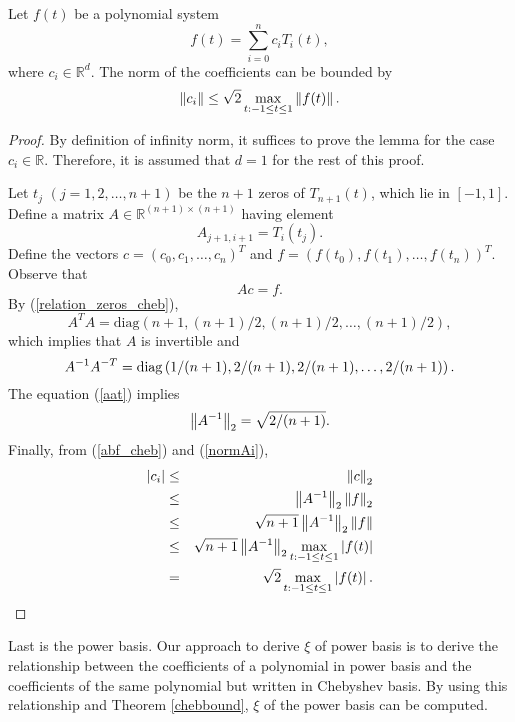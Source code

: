 \documentclass[12pt]{article}
\begin{document}
\begin{thm}
\label{chebbound} Let $f(t)$ be a polynomial system
\[
f(t) = \sum_{i=0}^n c_{i} T_i(t),
\]
where $c_{i} \in \mathbb{R}^d$. The norm of the coefficients
can be bounded by
\begin{equation}
\left\|c_{i}\right\| \leq  \sqrt{2} \max_{t : -1
\leq t \leq 1} \left\|f(t)\right\|.
\end{equation}
\end{thm}
\begin{proof}
By definition of infinity norm, it suffices to prove the lemma for
the case $c_i \in \mathbb{R}$.  Therefore, it is assumed that
$d = 1$ for the rest of this proof.

Let $t_j$ $(j=1,2,\ldots,n+1)$ be the $n+1$ zeros of $T_{n+1}(t)$,
which lie in $[-1,1]$. Define a matrix $A \in \mathbb{R}^{(n+1)
\times (n+1)}$ having element
\[
A_{j+1,i+1}=T_i(t_j).
\]
Define the vectors $c = (c_0, c_1, \ldots, c_n)^T$ and
$f = \left( f(t_0), f(t_1), \ldots, f(t_n) \right)^T.$
Observe that
\begin{equation}
\label{abf_cheb}
Ac = f.
\end{equation}
By (\ref{relation_zeros_cheb}),
\[
A^T A = \mathrm{diag}\left(n+1,(n+1)/2,(n+1)/2,\ldots,(n+1)/2\right),
\]
which implies that $A$ is invertible and
\begin{equation}
\label{aat}
A^{-1}A^{-T} = \mathrm{diag}\left(1/(n+1),2/(n+1),2/(n+1),\ldots,2/(n+1)\right).
\end{equation}
The equation (\ref{aat}) implies
\begin{equation}
\left\|A^{-1}\right\|_2=\sqrt{2/(n+1)}.
\label{normAi}
\end{equation}
Finally, from (\ref{abf_cheb}) and (\ref{normAi}),
\begin{eqnarray}
\left|c_i\right| & \leq & \left\|c\right\|_2 \nonumber \\
& \leq & \left\|A^{-1}\right\|_2\left\|f\right\|_2 \nonumber \\
& \leq & \sqrt{n+1}\left\|A^{-1}\right\|_2\left\|f\right\| \nonumber \\
& \leq & \sqrt{n+1}\left\|A^{-1}\right\|_2\max_{t : -1 \leq t \leq 1} \left|f(t)\right| \nonumber \\
& = & \sqrt{2}\max_{t : -1 \leq t \leq 1} \left|f(t)\right|. \nonumber \qedhere
\end{eqnarray}
\end{proof}

Last is the power basis.  Our approach to derive $\xi$ of power basis
is to derive the relationship between the coefficients of
a polynomial in power basis and the coefficients of the same
polynomial but written in Chebyshev basis.  By using this relationship
and Theorem \ref{chebbound}, $\xi$ of the power basis can be computed.
\end{document}
